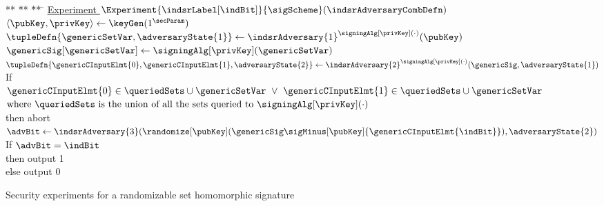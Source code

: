 \begin{figure}
{\begin{minipage}[t]{0.48\textwidth}
    \end{minipage}%
    \hfill
    \begin{minipage}[t]{0.48\textwidth}
      \begin{tabbing}
			** \= ** \= ** \=\kill
			\underline{Experiment $\Experiment{\indsrLabel[\indBit]}{\sigScheme}(\indsrAdversaryCombDefn)$} \\
			\> $\langle \pubKey, \privKey \rangle \gets \keyGen(1^{\secParam})$ \\
			\> $\tupleDefn{\genericSetVar, \adversaryState{1}} \gets 
			\indsrAdversary{1}^{\signingAlg[\privKey](\cdot)}(\pubKey)$  \\
			\> $\genericSig[\genericSetVar]  \gets \signingAlg[\privKey](\genericSetVar)$ \\
			\> $\tupleDefn{\genericCInputElmt{0}, \genericCInputElmt{1}, 
			\adversaryState{2} } 
			\gets  
			\indsrAdversary{2}^{\signingAlg[\privKey](\cdot)}(\genericSig, \adversaryState{1})$  \\
			\> If $\genericCInputElmt{0} \in \queriedSets \cup \genericSetVar ~\lor~
			\genericCInputElmt{1} \in \queriedSets \cup \genericSetVar$\\
			\> \> $\mbox{where $\queriedSets$ is the 
				union of all the sets queried to $\signingAlg[\privKey](\cdot)$ }$ \\
			\> \> \> then abort \\
			\> $\advBit \gets 
			\indsrAdversary{3}(\randomize[\pubKey](\genericSig \sigMinus[\pubKey] 
			\{\genericCInputElmt{\indBit}\}), \adversaryState{2})$ \\
			
			\> If $\advBit = \indBit$ \\
			\> \> then output 1 \\
			\> \> else output 0
		\end{tabbing}

    \end{minipage}%
}
\caption{Security experiments for a randomizable set homomorphic signature\label{fig:experiments}}
\end{figure}
